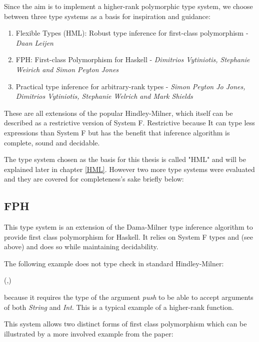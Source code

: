 \documentclass[twoside, titlepage, openright, a4paper]{book}
\newcommand{\Varid}[1]{\mathit{#1}}
\def\resethooks{%
  \global\let\SaveRestoreHook\empty
  \global\let\ColumnHook\empty}
\let\hspre\empty
\let\hspost\empty
\begin{document}
Since the aim is to implement a higher-rank polymorphic type system, we choose between three type systems as a basis for inspiration and guidance:

\begin{enumerate}
\item Flexible Types (HML): Robust type inference for first-class polymorphism - \textit{Daan Leijen}
\item FPH: First-class Polymorphism for Haskell - \textit{Dimitrios Vytiniotis, Stephanie Weirich and Simon Peyton Jones}
\item Practical type inference for arbitrary-rank types - \textit{Simon Peyton Jo Jones, Dimitrios Vytiniotis, Stephanie Welrich and Mark Shields}
\end{enumerate}

These are all extensions of the popular Hindley-Milner, which itself can be described as a restrictive version of System F. Restrictive because It can type less expressions than System F but has the benefit that inference algorithm is complete, sound and decidable.

The type system chosen as the basis for this thesis is called "HML" and will be explained later in chapter \ref{HML}. However two more type systems were evaluated and they are covered for completeness's sake briefly below:

\subsection{FPH\cite{FPH}}
This type system is an extension of the Dama-Milner type inference algorithm to provide first class polymorphism for Haskell. It relies on System F types and (see above) and does so while maintaining decidability. 

The following example does not type check in standard Hindley-Milner:
\begin{hscode}\SaveRestoreHook
\column{B}{@{}>{\hspre}l<{\hspost}@{}}%
\column{E}{@{}>{\hspre}l<{\hspost}@{}}%
\>[B]{}\Varid{f}\;\Varid{push}\mathrel{=}(\Varid{push}\;,\Varid{push}\;){}\<[E]%
\ColumnHook
\end{hscode}\resethooks

because it requires the type of the argument \textit{push} to be able to accept arguments of both \textit{String} and \textit{Int}. This is a typical example of a higher-rank function. 

This system allows two distinct forms of first class polymorphism which can be illustrated by a more involved example from the paper\cite{FPH}:
\end{document}
